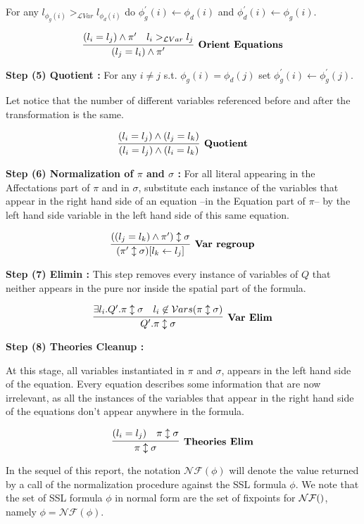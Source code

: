 \documentclass[a4paper,twoside,12pt]{report}
\newcommand\LVar{\mathcal{L}Var} %
\newcommand{\gton}[1]{>_{#1}}
\newcommand{\gtlvar}[0]{\gton{\LVar}}
\newcommand{\EqLoc}[2]{ (#1 = #2) }
\newcommand{\Formula}[2]{ #1  \updownarrow #2}
\newcommand{\NForm}[1]{\mathcal{NF}(#1)}
\newcommand{\Vars}[1]{\mathcal{V}ars(#1)}
\newcommand{\Subst}[3]{#3\lbrack #1\leftarrow #2 \rbrack}
\begin{document}
For any $l_{\phi_g(i)}\gtlvar l_{\phi_d(i)}$ do 
	$\phi^{\prime}_g(i)\leftarrow  \phi_d(i)$ and $\phi^{\prime}_d(i) \leftarrow \phi_g(i)$.


$$ \infer[\mbox{\textbf{Orient Equations}}]{(l_j=l_i)\wedge \pi^{\prime}} {(l_i=l_j)\wedge \pi^{\prime} & l_i \gtlvar l_j}$$	

{\bf Step (5) Quotient :}
For any $i\neq j$ s.t. $\phi_g(i)=\phi_d(j)$  set 
$\phi_g^{\prime}(i)\leftarrow \phi_g^{\prime}(j)$.

Let notice that the number of different variables referenced before and
after the transformation is the same.  

$$
\infer[\mbox{\textbf{Quotient}}]{\EqLoc{l_i}{l_j} \wedge \EqLoc{l_i}{l_k}}{\EqLoc{l_i}{l_j} \wedge \EqLoc{l_j}{l_k}} 
$$

{\bf Step (6) Normalization of $\pi$ and $\sigma$ :}
For all literal appearing in the Affectations part of $\pi$ and in $\sigma$,
substitute each instance of the  variables that appear in the right hand side of
an equation --in the Equation part of $\pi$-- by the left hand side variable in the left hand side of this same equation.

$$
\infer[\mbox{\textbf{Var regroup}}]{\Subst{l_k}{l_j}{(\Formula{\pi^{\prime}}{\sigma})}}{\Formula{(\EqLoc{l_j}{l_k}\wedge \pi^{\prime}) }{\sigma}} 
$$

{\bf Step (7) Elimin :}
This step removes every instance of variables of $Q$ that neither appears in  the pure nor inside the spatial part of the formula.

$$\infer[\mbox{\textbf{Var Elim}}]{Q^{\prime}.\Formula{\pi}{\sigma}}{\exists l_i.Q^{\prime}.\Formula{\pi}{\sigma} & l_i \not\in \Vars{\Formula{\pi}{\sigma}}}
$$

{\bf Step (8) Theories Cleanup :}

At this stage, all variables instantiated in $\pi$ and $\sigma$, appears
in the left hand side of the equation. Every equation describes some information
that are now irrelevant, as all the instances of the variables that appear in the right hand side of the equations don't appear anywhere in the formula.  

$$\infer[\mbox{\textbf{Theories Elim}}]{\Formula{\pi}{\sigma}}{\EqLoc{l_i}{l_j} & \Formula{\pi}{\sigma}}$$


In the sequel of this report, the notation $\NForm{\phi}$ will denote the
value returned by a call of the normalization procedure against the SSL formula $\phi$.
We note that the set of SSL formula $\phi$ in normal form are the set of
fixpoints for $\NForm$, namely $\phi=\NForm{\phi}$. 
\end{document}
